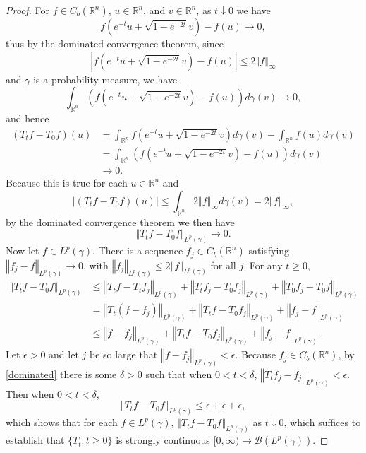 \documentclass{article}
\newcommand{\norm}[1]{\left\Vert #1 \right\Vert}
\theoremstyle{definition}
\begin{document}
\begin{proof}
For $f \in C_b(\mathbb{R}^n)$, $u \in \mathbb{R}^n$, and $v \in \mathbb{R}^n$,
as $t \downarrow 0$ we have 
\[
f\left(e^{-t}u+\sqrt{1-e^{-2t}}v\right) - f(u) \to 0,
\]
thus by the dominated convergence theorem, since
\[
\left| f\left(e^{-t}u+\sqrt{1-e^{-2t}}v\right) - f(u) \right| \leq 2\norm{f}_\infty
\]
and $\gamma$ is a probability measure,
we have
\[
 \int_{\mathbb{R}^n} \left(f\left(e^{-t}u+\sqrt{1-e^{-2t}}v\right)  - f(u) \right) d\gamma(v) \to 0,
\]
and hence
\begin{align*}
(T_t f - T_0 f)(u)& = 
\int_{\mathbb{R}^n} f\left(e^{-t}u+\sqrt{1-e^{-2t}}v\right) d\gamma(v)-\int_{\mathbb{R}^n} f(u) d\gamma(v)\\
&= \int_{\mathbb{R}^n} \left(f\left(e^{-t}u+\sqrt{1-e^{-2t}}v\right)  - f(u) \right) d\gamma(v)\\
&\to 0.
\end{align*}
Because this is true for each $u \in \mathbb{R}^n$ and
\[
|(T_t f - T_0 f)(u)|  \leq \int_{\mathbb{R}^n} 2\norm{f}_\infty d\gamma(v) = 2\norm{f}_\infty,
\]
by the dominated convergence theorem we then have
\begin{equation}
\norm{T_t f -T_0 f}_{L^p(\gamma)} \to 0.
\label{dominated}
\end{equation}
Now let $f \in L^p(\gamma)$. There is a sequence $f_j \in C_b(\mathbb{R}^n)$ satisfying
$\norm{f_j-f}_{L^p(\gamma)} \to 0$, with $\norm{f_j}_{L^p(\gamma)} \leq 2 \norm{f}_{L^p(\gamma)}$ for all $j$.
For any $t \geq 0$,
\begin{align*}
\norm{T_t f - T_0 f}_{L^p(\gamma)}&\leq \norm{T_tf - T_t f_j}_{L^p(\gamma)}
+\norm{T_t f_j - T_0 f_j}_{L^p(\gamma)}
+\norm{T_0 f_j - T_0 f}_{L^p(\gamma)}\\
&= \norm{T_t (f-f_j)}_{L^p(\gamma)} + \norm{T_tf-T_0 f_j}_{L^p(\gamma)} + \norm{f_j-f}_{L^p(\gamma)}\\
&\leq  \norm{f-f_j}_{L^p(\gamma)} +  \norm{T_tf-T_0 f_j}_{L^p(\gamma)} +\norm{f_j-f}_{L^p(\gamma)}.
\end{align*}
Let $\epsilon>0$ and let $j$ be so large that $\norm{f-f_j}_{L^p(\gamma)}<\epsilon$.
Because $f_j \in C_b(\mathbb{R}^n)$, by \eqref{dominated} there is some $\delta>0$ such that 
when $0 < t < \delta$, 
$\norm{T_t f_j - f_j}_{L^p(\gamma)}<\epsilon$. Then when $0 < t < \delta$,
\[
\norm{T_t f - T_0 f}_{L^p(\gamma)} \leq \epsilon+\epsilon+\epsilon,
\]
which shows that for each $f \in L^p(\gamma)$, $\norm{T_t f - T_0f}_{L^p(\gamma)}$ as $t \downarrow 0$, which suffices
to establish that $\{T_t:t \geq 0\}$ is strongly continuous $[0,\infty) \to \mathscr{B}(L^p(\gamma))$. 
\end{proof}
\end{document}
